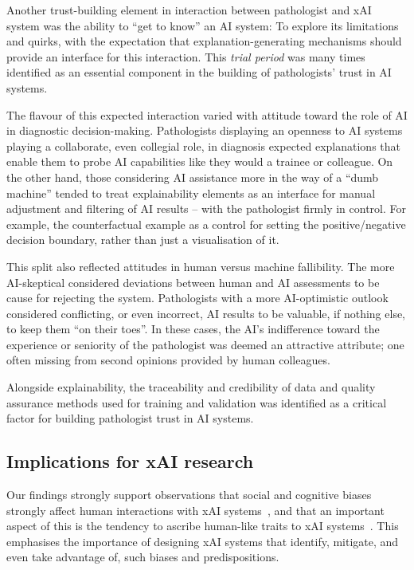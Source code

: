 \documentclass[final,5p,times,twocolumn,hyphens]{elsarticle}
\begin{document}
Another trust-building element in interaction between pathologist and xAI system was the ability to ``get to know'' an AI system: To explore its limitations and quirks, with the expectation that explanation-generating mechanisms should provide an interface for this interaction. This \textit{trial period} was many times identified as an essential component in the building of pathologists' trust in AI systems. 

The flavour of this expected interaction varied with attitude toward the role of AI in diagnostic decision-making. Pathologists displaying an openness to AI systems playing a collaborate, even collegial role, in diagnosis expected explanations that enable them to probe AI capabilities like they would a trainee or colleague. On the other hand, those considering AI assistance more in the way of a ``dumb machine'' tended to treat explainability elements as an interface for manual adjustment and filtering of AI results -- with the pathologist firmly in control. For example, the counterfactual example as a control for setting the positive/negative decision boundary, rather than just a visualisation of it.

This split also reflected attitudes in human versus machine fallibility. The more AI-skeptical considered deviations between human and AI assessments to be cause for rejecting the system. Pathologists with a more AI-optimistic outlook considered conflicting, or even incorrect, AI results to be valuable, if nothing else, to keep them ``on their toes''. In these cases, the AI's indifference toward the experience or seniority of the pathologist was deemed an attractive attribute; one often missing from second opinions provided by human colleagues.

Alongside explainability, the traceability and credibility of data and quality assurance methods used for training and validation was identified as a critical factor for building pathologist trust in AI systems.

\subsection{Implications for xAI research}

Our findings strongly support observations that social and cognitive biases strongly affect human interactions with xAI systems~\cite{miller2019explanation, jussupow2021augmenting}, and that an important aspect of this is the tendency to ascribe human-like traits to xAI systems~\cite{de2017people, miller2019explanation}. This emphasises the importance of designing xAI systems that identify, mitigate, and even take advantage of, such biases and predispositions.
\end{document}
